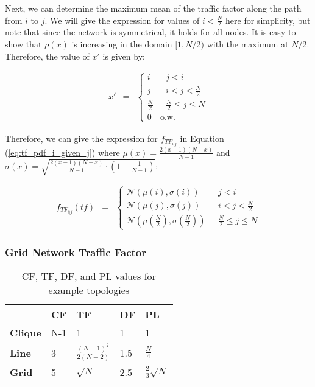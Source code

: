 Next, we can determine the maximum mean of the traffic factor along the path from $i$ to $j$.  We will give the expression for values of $i < \frac{N}{2}$ here for simplicity, but note that since the network is symmetrical, it holds for all nodes.  It is easy to show that $\rho(x)$ is increasing in the domain $[1,N/2)$ with the maximum at $N/2$.  Therefore, the value of $x'$ is given by: 

\begin{eqnarray*}
	x' &=&
		\left\{\begin{array}{ll}
		i & \mbox{    } j < i \\
		j & \mbox{    } i < j < \frac{N}{2} \\
		\frac{N}{2} & \mbox{    } \frac{N}{2} \leq j \leq N \\ 
		0 &\mbox{o.w.}
		\end{array}\right.
\end{eqnarray*}

Therefore, we can give the expression for $f_{TF_{i | j}}$ in Equation (\ref{eq:tf_pdf_i_given_j}) where $\mu(x) = \frac{2(x-1)(N-x)}{N-1}$ and $\sigma(x) = \sqrt{\frac{2(x-1)(N-x)}{N-1} \cdot (1 - \frac{1}{N-1} )}$:

\begin{eqnarray}
	f_{TF_{i | j}} (tf) &=&
		\left\{\begin{array}{ll}
		\mathcal{N}( \mu(i), \sigma(i) ) & \mbox{    } j < i \\
		\mathcal{N}( \mu(j), \sigma(j) ) & \mbox{    } i < j < \frac{N}{2} \\
		\mathcal{N}( \mu(\frac{N}{2}), \sigma(\frac{N}{2}) ) & \mbox{    } \frac{N}{2} \leq j \leq N 
		\end{array}\right.
		\label{eq:tf_pdf_i_given_j}
\end{eqnarray}

\subsubsection{Grid Network Traffic Factor}



\begin{table}[h]
\centering
\begin{tabular}{l|l|l|l|l|}
\cline{2-5}
                            					 & \textbf{CF}  					& \textbf{TF}   				& \textbf{DF}	& \textbf{PL} 			\\ \hline
\multicolumn{1}{|l|}{\textbf{Clique}} 	& N-1 							& 1                              		& 1  			& 1 					\\ \hline
\multicolumn{1}{|l|}{\textbf{Line}}   	& 3   							& $\frac{(N-1)^2}{2(N-2)}$ 	& 1.5 			& $\frac{N}{4}$			\\ \hline
\multicolumn{1}{|l|}{\textbf{Grid}}   	& 5   							& $\sqrt{N}$                       	&  2.5			& $\frac{2}{3} \sqrt{N}$   \\ \hline
\end{tabular}
\caption{CF, TF, DF, and PL values for example topologies}
\label{table:rf_ff_sf_values}
\end{table}

